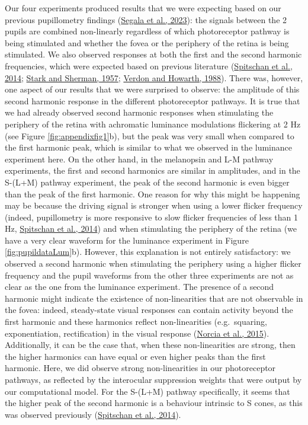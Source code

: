 \documentclass[
]{article}
\begin{document}
Our four experiments produced results that we were expecting based on our previous pupillometry findings (\protect\hyperlink{ref-Segala2023}{Segala et al., 2023}): the signals between the 2 pupils are combined non-linearly regardless of which photoreceptor pathway is being stimulated and whether the fovea or the periphery of the retina is being stimulated. We also observed responses at both the first and the second harmonic frequencies, which were expected based on previous literature (\protect\hyperlink{ref-Spitschan2014}{Spitschan et al., 2014}; \protect\hyperlink{ref-Stark1957}{Stark and Sherman, 1957}; \protect\hyperlink{ref-Verdon1988}{Verdon and Howarth, 1988}). There was, however, one aspect of our results that we were surprised to observe: the amplitude of this second harmonic response in the different photoreceptor pathways. It is true that we had already observed second harmonic responses when stimulating the periphery of the retina with achromatic luminance modulations flickering at 2 Hz (see Figure \ref{fig:appendixfig1}b), but the peak was very small when compared to the first harmonic peak, which is similar to what we observed in the luminance experiment here. On the other hand, in the melanopsin and L-M pathway experiments, the first and second harmonics are similar in amplitudes, and in the S-(L+M) pathway experiment, the peak of the second harmonic is even bigger than the peak of the first harmonic. One reason for why this might be happening may be because the driving signal is stronger when using a lower flicker frequency (indeed, pupillometry is more responsive to slow flicker frequencies of less than 1 Hz, \protect\hyperlink{ref-Spitschan2014}{Spitschan et al., 2014}) and when stimulating the periphery of the retina (we have a very clear waveform for the luminance experiment in Figure \ref{fig:pupildataLum}b). However, this explanation is not entirely satisfactory: we observed a second harmonic when stimulating the periphery using a higher flicker frequency and the pupil waveforms from the other three experiments are not as clear as the one from the luminance experiment. The presence of a second harmonic might indicate the existence of non-linearities that are not observable in the fovea: indeed, steady-state visual responses can contain activity beyond the first harmonic and these harmonics reflect non-linearities (e.g.~squaring, exponentiation, rectification) in the visual response (\protect\hyperlink{ref-Norcia2015}{Norcia et al., 2015}). Additionally, it can be the case that, when these non-linearities are strong, then the higher harmonics can have equal or even higher peaks than the first harmonic. Here, we did observe strong non-linearities in our photoreceptor pathways, as reflected by the interocular suppression weights that were output by our computational model. For the S-(L+M) pathway specifically, it seems that the higher peak of the second harmonic is a behaviour intrinsic to S cones, as this was observed previously (\protect\hyperlink{ref-Spitschan2014}{Spitschan et al., 2014}).
\end{document}
